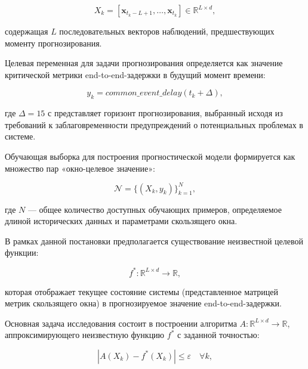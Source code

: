 \begin{equation}
	X_k = [\mathbf{x}_{t_k - L + 1}, \ldots, \mathbf{x}_{t_k}] \in \mathbb{R}^{L \times d},
\end{equation}

содержащая $L$ последовательных векторов наблюдений, предшествующих моменту прогнозирования.

\hspace*{1.25cm}Целевая переменная для задачи прогнозирования определяется как значение критической метрики end-to-end-задержки в будущий момент времени:

\begin{equation}
	y_k = common\_event\_delay(t_k + \Delta),
\end{equation}

где $\Delta = 15$ с представляет горизонт прогнозирования, выбранный исходя из требований к заблаговременности предупреждений о потенциальных проблемах в системе.

\hspace*{1.25cm}Обучающая выборка для построения прогностической модели формируется как множество пар «окно-целевое значение»:

\begin{equation}
	\mathcal{N} = \{(X_k, y_k)\}_{k=1}^{N},
\end{equation}

где $N$ --- общее количество доступных обучающих примеров, определяемое длиной исторических данных и параметрами скользящего окна.

\hspace*{1.25cm}В рамках данной постановки предполагается существование неизвестной целевой функции:

\begin{equation}
	f^*: \mathbb{R}^{L \times d} \to \mathbb{R},
\end{equation}

которая отображает текущее состояние системы (представленное матрицей метрик скользящего окна) в прогнозируемое значение end-to-end-задержки. 

\hspace*{1.25cm}Основная задача исследования состоит в построении алгоритма $A: \mathbb{R}^{L \times d} \to \mathbb{R}$, аппроксимирующего неизвестную функцию $f^*$ с заданной точностью:

\begin{equation}
	|A(X_k) - f^*(X_k)| \le \varepsilon \quad \forall k,
\end{equation}

